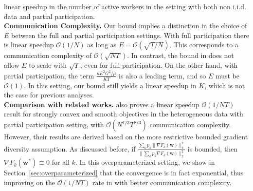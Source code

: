 linear speedup in the number of active workers in the setting with
both non i.i.d. data and partial participation. \\
\textbf{Communication Complexity.} Our bound implies a distinction
in the choice of $E$ between the full and partial participation settings.
With full participation there is linear speedup $\mathcal{O}(1/N)$
as long as $E=\mathcal{O}(\sqrt{T/N})$. This corresponds to a communication
complexity of $\mathcal{O}(\sqrt{NT})$. In contrast, the bound in
\cite{li2019convergence} does not allow $E$ to scale with $\sqrt{T}$,
even for full participation. On the other hand, with partial participation,
the term $\frac{\kappa E^{2}G^{2}/\mu}{KT}$ is also a leading term,
and so $E$ must be $\mathcal{O}(1)$. In this setting, our bound
still yields a linear speedup in $K$, which is not the case for previous
analyses. \\
\textbf{Comparison with related works.} \cite{haddadpour2019convergence}
also proves a linear speedup $\mathcal{O}(1/NT)$ result for strongly
convex and smooth objectives in the heterogeneous data with partial
participation setting, with $\mathcal{O}(N^{1/3}T^{2/3})$ communication
complexity. However, their results are derived based on the more restrictive
bounded gradient diversity assumption. As discussed before, if $\frac{\sum_{k}p_{k}\|\nabla F_{k}(\mathbf{w})\|_{2}^{2}}{\|\sum_{k}p_{k}\nabla F_{k}(\mathbf{w})\|_{2}^{2}}$
is bounded, then $\nabla F_{k}(\mathbf{w}^{\ast})\equiv0$ for all
$k$. In this overparameterized setting, we show in Section~\ref{sec:overparameterized}
that the convergence is in fact exponential, thus improving on the
$\mathcal{O}(1/NT)$ rate in \cite{haddadpour2019convergence} with
better communication complexity. 

